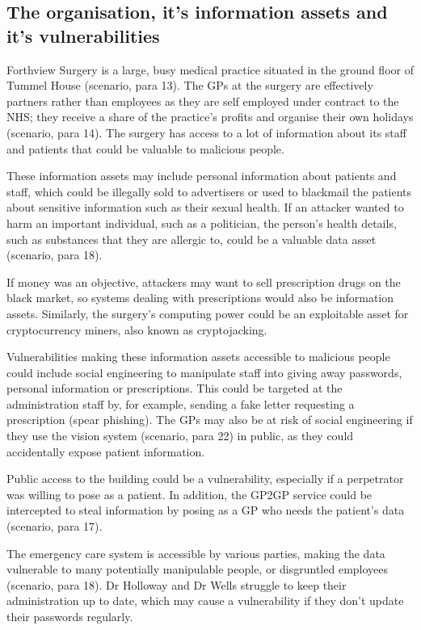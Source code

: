 \documentclass[12pt,a4paper]{article}
\begin{document}
\subsection{The organisation, it's information assets and it's vulnerabilities}
Forthview Surgery is a large, busy medical practice situated in the ground floor of Tummel House (scenario, para 13). The GPs at the surgery are effectively partners rather than employees as they are self employed under contract to the NHS; they receive a share of the practice's profits and organise their own holidays (scenario, para 14). The surgery has access to a lot of information about its staff and patients that could be valuable to malicious people.

These information assets may include personal information about patients and staff, which could be illegally sold to advertisers or used to blackmail the patients about sensitive information such as their sexual health. If an attacker wanted to harm an important individual, such as a politician, the person's health details, such as substances that they are allergic to, could be a valuable data asset (scenario, para 18). 

If money was an objective, attackers may want to sell prescription drugs on the black market, so systems dealing with prescriptions would also be information assets. Similarly, the surgery's computing power could be an exploitable asset for cryptocurrency miners, also known as cryptojacking.

Vulnerabilities making these information assets accessible to malicious people could include social engineering to manipulate staff into giving away passwords, personal information or prescriptions. This could be targeted at the administration staff by, for example, sending a fake letter requesting a prescription (spear phishing). The GPs may also be at risk of social engineering if they use the vision system (scenario, para 22) in public, as they could accidentally expose patient information. 

Public access to the building could be a vulnerability, especially if a perpetrator was willing to pose as a patient. In addition, the GP2GP service could be intercepted to steal information by posing as a GP who needs the patient's data (scenario, para 17).

The emergency care system is accessible by various parties, making the data vulnerable to many potentially manipulable people, or disgruntled employees (scenario, para 18). Dr Holloway and Dr Wells struggle to keep their administration up to date, which may cause a vulnerability if they don't update their passwords regularly. 
\end{document}
